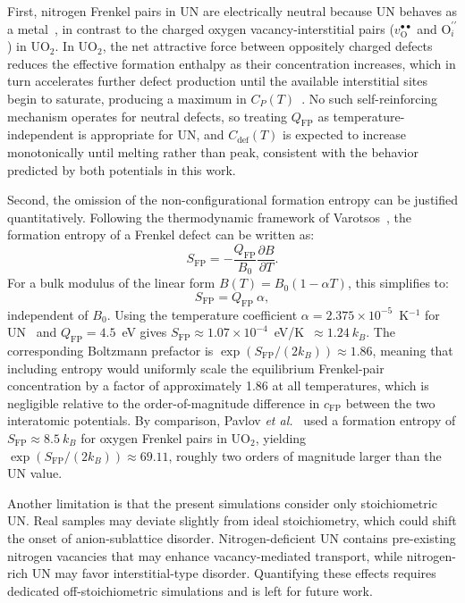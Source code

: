 \documentclass[preprint,12pt,sort&compress]{elsarticle}
\newcommand{\?}{\stackrel{?}{=}}
\begin{document}
First, nitrogen Frenkel pairs in UN are electrically neutral because UN behaves as a metal~\cite{AbdulHameed2024b}, in contrast to the charged oxygen vacancy-interstitial pairs ($v_\text{O}^{\bullet\bullet}$ and $\text{O}_i^{\prime\prime}$) in UO$_2$. In UO$_2$, the net attractive force between oppositely charged defects reduces the effective formation enthalpy as their concentration increases, which in turn accelerates further defect production until the available interstitial sites begin to saturate, producing a maximum in $C_P(T)$~\cite{Pavlov2017,Cooper2014}. No such self-reinforcing mechanism operates for neutral defects, so treating $Q_\text{FP}$ as temperature-independent is appropriate for UN, and $C_\text{def}(T)$ is expected to increase monotonically until melting rather than peak, consistent with the behavior predicted by both potentials in this work.

Second, the omission of the non-configurational formation entropy can be justified quantitatively. Following the thermodynamic framework of Varotsos~\cite{Varotsos1976}, the formation entropy of a Frenkel defect can be written as:
\begin{equation}
S_\text{FP} = -\frac{Q_\text{FP}}{B_0}\frac{\partial B}{\partial T}.
\label{Eq:S_F}
\end{equation}
For a bulk modulus of the linear form $B(T) = B_0(1 - \alpha T)$, this simplifies to:
\begin{equation}
S_\text{FP} = Q_\text{FP} \ \alpha,
\end{equation}
independent of $B_0$. Using the temperature coefficient $\alpha = 2.375\times10^{-5}$~K$^{-1}$ for UN~\cite{Hayes1990II} and $Q_\text{FP} = 4.5$~eV gives $S_\text{FP} \approx 1.07\times10^{-4}$~eV/K~$\approx 1.24 \ k_B$. The corresponding Boltzmann prefactor is $\exp(S_\text{FP}/(2k_B)) \approx 1.86$, meaning that including entropy would uniformly scale the equilibrium Frenkel-pair concentration by a factor of approximately 1.86 at all temperatures, which is negligible relative to the order-of-magnitude difference in $c_\text{FP}$ between the two interatomic potentials. By comparison, Pavlov \textit{et al.}~\cite{Pavlov2017} used a formation entropy of $S_\text{FP} \approx 8.5 \ k_B$ for oxygen Frenkel pairs in UO$_2$, yielding $\exp(S_\text{FP}/(2k_B)) \approx 69.11$, roughly two orders of magnitude larger than the UN value.

Another limitation is that the present simulations consider only stoichiometric UN. Real samples may deviate slightly from ideal stoichiometry, which could shift the onset of anion-sublattice disorder. Nitrogen-deficient UN contains pre-existing nitrogen vacancies that may enhance vacancy-mediated transport, while nitrogen-rich UN may favor interstitial-type disorder. Quantifying these effects requires dedicated off-stoichiometric simulations and is left for future work.
\end{document}

